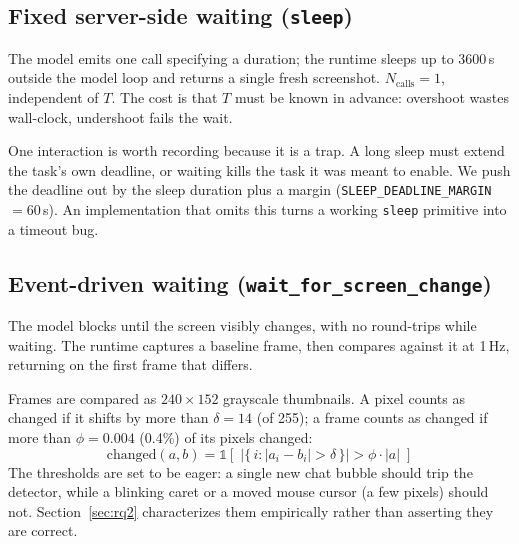 \documentclass[conference]{IEEEtran}
\begin{document}
\subsection{Fixed server-side waiting (\texttt{sleep})}
The model emits one call specifying a duration; the runtime sleeps up to 3600\,s
outside the model loop and returns a single fresh screenshot.
$N_{\text{calls}} = 1$, independent of $T$. The cost is that $T$ must be known in
advance: overshoot wastes wall-clock, undershoot fails the wait.

One interaction is worth recording because it is a trap. A long sleep must extend
the task's own deadline, or waiting kills the task it was meant to enable. We
push the deadline out by the sleep duration plus a margin
(\texttt{SLEEP\_DEADLINE\_MARGIN} $=60$\,s). An implementation that omits this
turns a working \texttt{sleep} primitive into a timeout bug.

\subsection{Event-driven waiting (\texttt{wait\_for\_screen\_change})}
The model blocks until the screen visibly changes, with no round-trips while
waiting. The runtime captures a baseline frame, then compares against it at
1\,Hz, returning on the first frame that differs.

Frames are compared as $240\times152$ grayscale thumbnails. A pixel counts as
changed if it shifts by more than $\delta = 14$ (of 255); a frame counts as
changed if more than $\phi = 0.004$ (0.4\%) of its pixels changed:
\begin{equation}
\text{changed}(a,b) = \mathbb{1}\!\left[\;\left|\{\,i : |a_i - b_i| > \delta\,\}\right|
> \phi \cdot |a|\;\right]
\label{eq:change}
\end{equation}
The thresholds are set to be eager: a single new chat bubble should trip the
detector, while a blinking caret or a moved mouse cursor (a few pixels) should
not. Section~\ref{sec:rq2} characterizes them empirically rather than asserting
they are correct.
\end{document}

